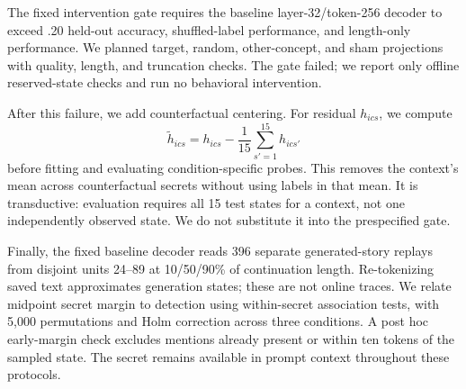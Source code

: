 The fixed intervention gate requires the baseline layer-32/token-256 decoder to exceed .20 held-out accuracy, shuffled-label performance, and length-only performance. We planned target, random, other-concept, and sham projections with quality, length, and truncation checks. The gate failed; we report only offline reserved-state checks and run no behavioral intervention.

After this failure, we add counterfactual centering. For residual $h_{ics}$, we compute
\begin{equation}
 \widetilde h_{ics}=h_{ics}-\frac{1}{15}\sum_{s'=1}^{15}h_{ics'}
\label{eq:center}
\end{equation}
before fitting and evaluating condition-specific probes. This removes the context's mean across counterfactual secrets without using labels in that mean. It is transductive: evaluation requires all 15 test states for a context, not one independently observed state. We do not substitute it into the prespecified gate.

Finally, the fixed baseline decoder reads 396 separate generated-story replays from disjoint units 24--89 at 10/50/90\% of continuation length. Re-tokenizing saved text approximates generation states; these are not online traces. We relate midpoint secret margin to detection using within-secret association tests, with 5,000 permutations and Holm correction across three conditions. A post hoc early-margin check excludes mentions already present or within ten tokens of the sampled state. The secret remains available in prompt context throughout these protocols.
